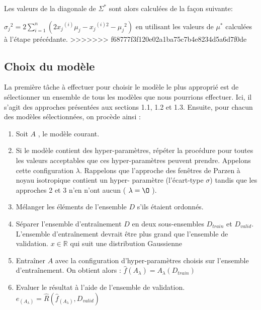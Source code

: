 \documentclass[a4paper,10pt]{article}
\begin{document}
Les valeurs de la diagonale de $\Sigma^*$ sont alors calculées de la façon suivante:

$ {\sigma_j}^2 = 2 \sum_{i = 1}^{n}(2 {x_j}^{(i)}  \mu_j - {x_j}^{(i)2} - {\mu_j}^2)$ en utilisant les valeurs de $\mu^*$ calculées à l'étape précédante.
>>>>>>> f68777f3f120e02a1ba75c7b4e8234d5a6d7f0de

\subsection{Choix du modèle}

La première tâche à effectuer pour choisir le modèle le plus approprié est de sélectionner un ensemble de tous les modèles que nous pourrions effectuer. Ici, il s'agit des approches présentées aux sections 1.1, 1.2 et 1.3. Ensuite, pour chacun des modèles sélectionnées, on procède ainsi :

\begin{enumerate}
	\item Soit $A$ , le modèle courant.
	\item Si le modèle contient des hyper-paramètres, répéter la procédure pour toutes les valeurs acceptables que ces hyper-paramètres peuvent prendre. Appelons cette configuration $\lambda$. Rappelons que l'approche des fenêtres de Parzen à noyau isotropique contient un hyper- paramètre (l'écart-type $\sigma$) tandis que les approches 2 et 3 n'en n'ont aucun ( $\lambda= \O$ ).
	\item Mélanger les éléments de l'ensemble $D$ s'ils étaient ordonnés.
	\item Séparer l'ensemble d'entraînement $D$ en deux sous-ensembles $D_{train}$ et $D_{valid}$. L'ensemble d’entraînement devrait être plus grand que l'ensemble de validation. $x \in \mathds{R}$ qui suit une distribution Gaussienne
	\item Entraîner $A$ avec la configuration d'hyper-paramètres choisis sur l'ensemble d'entraînement. On obtient alors : $\widehat{f} (A_{\lambda})=A_{\lambda}(D_{train})$
	\item Evaluer le résultat à l'aide de l'ensemble de validation. $e_{(A_{\lambda})} = \widehat{R} ( \widehat{f}_{(A_{\lambda})} , D_{valid} )$
\end{enumerate}
\end{document}
